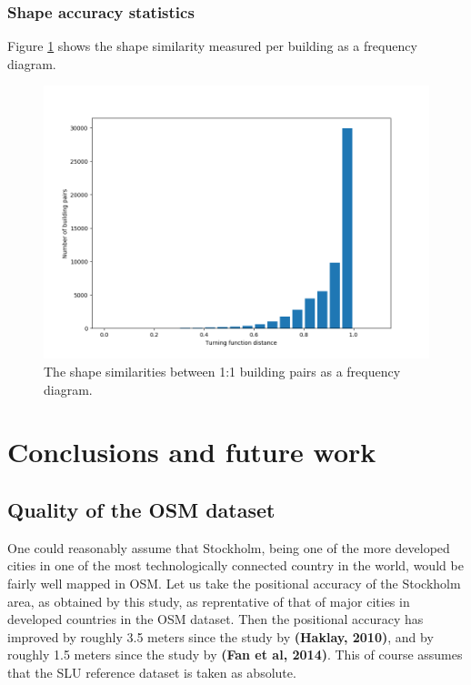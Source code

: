 \documentclass{kththesis}
\begin{document}
\subsection{Shape accuracy statistics}

Figure \ref{fig:bar-plot-similarity} shows the shape similarity measured per building as a frequency diagram.

\begin{figure}[H]
    \centering
    \includegraphics[width=\textwidth,height=0.5\textheight,keepaspectratio]{img_turning_function_plot}
    \caption{The shape similarities between 1:1 building pairs as a frequency diagram.}
    \label{fig:bar-plot-similarity}
\end{figure}

\chapter{Conclusions and future work}

\section{Quality of the OSM dataset}

One could reasonably assume that Stockholm, being one of the more developed cities in one of the most technologically connected country in the world, would be fairly well mapped in OSM.
Let us take the positional accuracy of the Stockholm area, as obtained by this study, as reprentative of that of major cities in developed countries in the OSM dataset.
Then the positional accuracy has improved by roughly 3.5 meters since the study by \textbf{(Haklay, 2010)}, and by roughly 1.5 meters since the study by \textbf{(Fan et al, 2014)}.
This of course assumes that the SLU reference dataset is taken as absolute.
\end{document}
